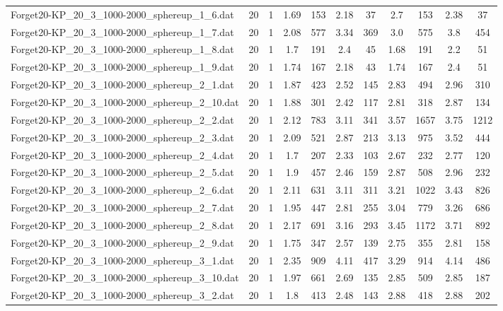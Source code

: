 \begin{table}[!ht]
\begin{tabular}{lcccccccccc}
Forget20-KP\_20\_3\_1000-2000\_sphereup\_1\_6.dat & 20 & 1 & 1.69 & 153 & 2.18 & 37 & 2.7 & 153 & 2.38 & 37 \\
Forget20-KP\_20\_3\_1000-2000\_sphereup\_1\_7.dat & 20 & 1 & 2.08 & 577 & 3.34 & 369 & 3.0 & 575 & 3.8 & 454 \\
Forget20-KP\_20\_3\_1000-2000\_sphereup\_1\_8.dat & 20 & 1 & 1.7 & 191 & 2.4 & 45 & 1.68 & 191 & 2.2 & 51 \\
Forget20-KP\_20\_3\_1000-2000\_sphereup\_1\_9.dat & 20 & 1 & 1.74 & 167 & 2.18 & 43 & 1.74 & 167 & 2.4 & 51 \\
Forget20-KP\_20\_3\_1000-2000\_sphereup\_2\_1.dat & 20 & 1 & 1.87 & 423 & 2.52 & 145 & 2.83 & 494 & 2.96 & 310 \\
Forget20-KP\_20\_3\_1000-2000\_sphereup\_2\_10.dat & 20 & 1 & 1.88 & 301 & 2.42 & 117 & 2.81 & 318 & 2.87 & 134 \\
Forget20-KP\_20\_3\_1000-2000\_sphereup\_2\_2.dat & 20 & 1 & 2.12 & 783 & 3.11 & 341 & 3.57 & 1657 & 3.75 & 1212 \\
Forget20-KP\_20\_3\_1000-2000\_sphereup\_2\_3.dat & 20 & 1 & 2.09 & 521 & 2.87 & 213 & 3.13 & 975 & 3.52 & 444 \\
Forget20-KP\_20\_3\_1000-2000\_sphereup\_2\_4.dat & 20 & 1 & 1.7 & 207 & 2.33 & 103 & 2.67 & 232 & 2.77 & 120 \\
Forget20-KP\_20\_3\_1000-2000\_sphereup\_2\_5.dat & 20 & 1 & 1.9 & 457 & 2.46 & 159 & 2.87 & 508 & 2.96 & 232 \\
Forget20-KP\_20\_3\_1000-2000\_sphereup\_2\_6.dat & 20 & 1 & 2.11 & 631 & 3.11 & 311 & 3.21 & 1022 & 3.43 & 826 \\
Forget20-KP\_20\_3\_1000-2000\_sphereup\_2\_7.dat & 20 & 1 & 1.95 & 447 & 2.81 & 255 & 3.04 & 779 & 3.26 & 686 \\
Forget20-KP\_20\_3\_1000-2000\_sphereup\_2\_8.dat & 20 & 1 & 2.17 & 691 & 3.16 & 293 & 3.45 & 1172 & 3.71 & 892 \\
Forget20-KP\_20\_3\_1000-2000\_sphereup\_2\_9.dat & 20 & 1 & 1.75 & 347 & 2.57 & 139 & 2.75 & 355 & 2.81 & 158 \\
Forget20-KP\_20\_3\_1000-2000\_sphereup\_3\_1.dat & 20 & 1 & 2.35 & 909 & 4.11 & 417 & 3.29 & 914 & 4.14 & 486 \\
Forget20-KP\_20\_3\_1000-2000\_sphereup\_3\_10.dat & 20 & 1 & 1.97 & 661 & 2.69 & 135 & 2.85 & 509 & 2.85 & 187 \\
Forget20-KP\_20\_3\_1000-2000\_sphereup\_3\_2.dat & 20 & 1 & 1.8 & 413 & 2.48 & 143 & 2.88 & 418 & 2.88 & 202 \\

\end{tabular}
\end{table}
